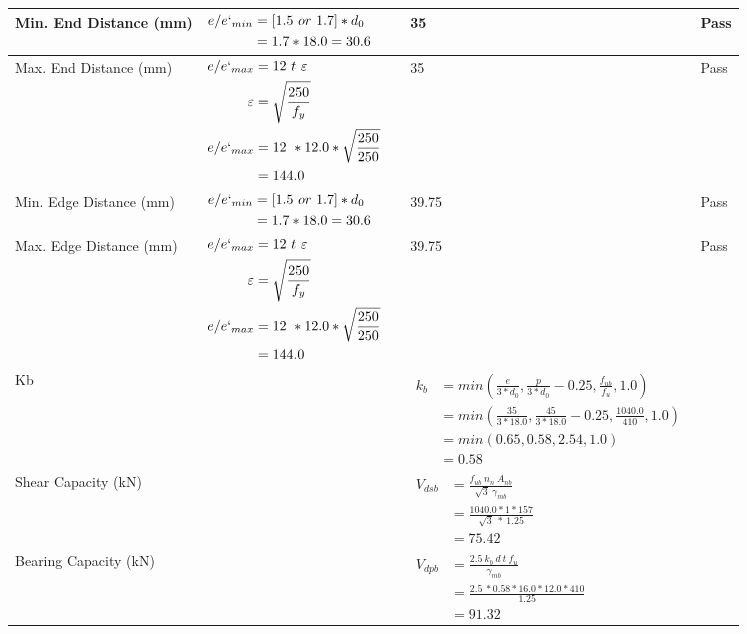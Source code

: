 \documentclass{article}%
\begin{document}
\begin{longtable}{|p{2.5cm}|p{5.5cm}|p{7cm}|p{1cm}|}
\hline%
Min. End Distance (mm)&$\begin{aligned}e/e`_{min} &=[1.5~or~ 1.7] * d_0\\ &=1.7*18.0=30.6 \end{aligned}$&35&Pass\\%
\hline%
Max. End Distance (mm)&$\begin{aligned}e/e`_{max} &= 12~ t~ \varepsilon&\\ \varepsilon &= \sqrt{\frac{250}{f_y}}\\ e/e`_{max}&=12 ~*12.0*\sqrt{\frac{250}{250}}\\ &=144.0\\ \end{aligned}$&35&Pass\\%
\hline%
Min. Edge Distance (mm)&$\begin{aligned}e/e`_{min} &=[1.5~or~ 1.7] * d_0\\ &=1.7*18.0=30.6 \end{aligned}$&39.75&Pass\\%
\hline%
Max. Edge Distance (mm)&$\begin{aligned}e/e`_{max} &= 12~ t~ \varepsilon&\\ \varepsilon &= \sqrt{\frac{250}{f_y}}\\ e/e`_{max}&=12 ~*12.0*\sqrt{\frac{250}{250}}\\ &=144.0\\ \end{aligned}$&39.75&Pass\\%
\hline%
Kb& &$\begin{aligned} k_b & = min(\frac{e}{3*d_0},\frac{p}{3*d_0}-0.25,\frac{f_{ub}}{f_u},1.0)\\ & = min(\frac{35}{3*18.0},\frac{45}{3*18.0}-0.25,\frac{1040.0}{410},1.0)\\ & = min(0.65,0.58,2.54,1.0)\\ & = 0.58\end{aligned}$&\\%
\hline%
Shear Capacity (kN)&&$\begin{aligned}V_{dsb} &= \frac{f_{ub} ~n_n~ A_{nb}}{\sqrt{3} ~\gamma_{mb}}\\ &= \frac{1040.0*1*157}{\sqrt{3}~*~1.25}\\ &= 75.42\end{aligned}$&\\%
\hline%
Bearing Capacity (kN)&&$\begin{aligned}V_{dpb} &= \frac{2.5~ k_b~ d~ t~ f_u}{\gamma_{mb}}\\ &= \frac{2.5~*0.58*16.0*12.0*410}{1.25}\\ &=91.32\end{aligned}$&\\%

\end{longtable}
\end{document}

